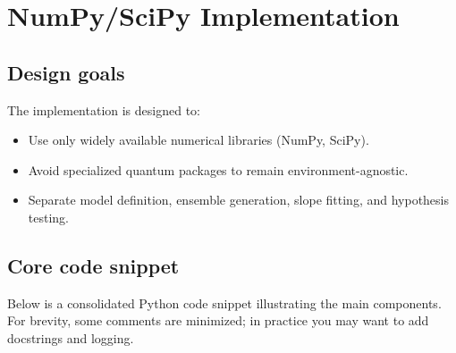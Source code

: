 \documentclass[11pt]{article}
\begin{document}
\section{NumPy/SciPy Implementation}

\subsection{Design goals}

The implementation is designed to:
\begin{itemize}
  \item Use only widely available numerical libraries (NumPy, SciPy).
  \item Avoid specialized quantum packages to remain environment-agnostic.
  \item Separate model definition, ensemble generation, slope fitting, and hypothesis testing.
\end{itemize}

\subsection{Core code snippet}

Below is a consolidated Python code snippet illustrating the main components. For brevity, some comments are minimized; in practice you may want to add docstrings and logging.
\end{document}
